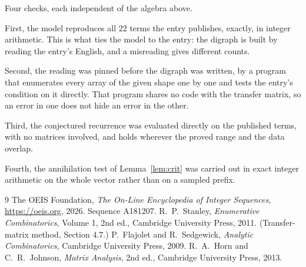 \documentclass[11pt,a4paper]{article}
\theoremstyle{plain}
\theoremstyle{definition}
\begin{document}
Four checks, each independent of the algebra above.

First, the model reproduces all $22$ terms the entry publishes, exactly, in integer
arithmetic. This is what ties the model to the entry: the digraph is built by reading the
entry's English, and a misreading gives different counts.

Second, the reading was pinned before the digraph was written, by a program that enumerates
every array of the given shape one by one and tests the entry's condition on it directly. That program shares no code with the transfer matrix, so an error in one does not
hide an error in the other.

Third, the conjectured recurrence was evaluated directly on the published terms, with no
matrices involved, and holds wherever the proved range and the data overlap.

Fourth, the annihilation test of Lemma~\ref{lem:crit} was carried out in exact integer
arithmetic on the whole vector rather than on a sampled prefix.

\begin{thebibliography}{9}
 The OEIS Foundation, \emph{The On-Line Encyclopedia of Integer
Sequences}, \url{https://oeis.org}, 2026. Sequence A181207.
 R.~P.~Stanley, \emph{Enumerative Combinatorics}, Volume 1, 2nd ed.,
Cambridge University Press, 2011. (Transfer-matrix method, Section 4.7.)
 P.~Flajolet and R.~Sedgewick, \emph{Analytic Combinatorics}, Cambridge
University Press, 2009.
 R.~A.~Horn and C.~R.~Johnson, \emph{Matrix Analysis}, 2nd ed., Cambridge
University Press, 2013.
\end{thebibliography}
\end{document}
